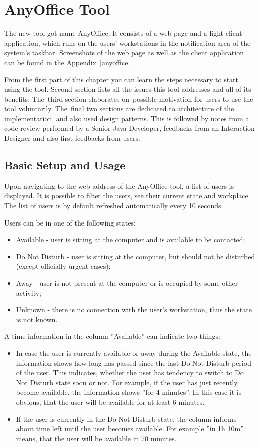 \documentclass[11pt,singleside]{myfithesis2}
\begin{document}
\chapter{AnyOffice Tool}

The new tool got name AnyOffice. It consists of a web page and a light client application, which runs on the users' workstations in the notification area of the system's taskbar. Screenshots of the web page as well as the client application can be found in the Appendix~\ref{anyoffice}.

From the first part of this chapter you can learn the steps necessary to start using the tool. Second section lists all the issues this tool addresses and all of its benefits. The~third section elaborates on~possible motivation for users to use the tool voluntarily. The~final two sections are dedicated to architecture of the implementation, and also used design patterns. This is followed by notes from a code review performed by a Senior Java Developer, feedbacks from an Interaction Designer and also first feedbacks from users.


	\section{Basic Setup and Usage}
Upon navigating to the web address of the AnyOffice tool, a list of users is displayed. It is possible to filter the users, see their current state and workplace. The list of users is by default refreshed automatically every 10 seconds.

Users can be in one of the following states:
\begin{itemize}
	\item Available - user is sitting at the computer and is available to be contacted;
	\item Do Not Disturb - user is sitting at the computer, but should not be disturbed (except officially urgent cases);
	\item Away - user is not present at the computer or is occupied by some other activity;
	\item Unknown - there is no connection with the user's workstation, thus the state is not known.
\end{itemize}

A time information in the column ''Available'' can indicate two things:
\begin{itemize}
	\item In case the user is currently available or away during the Available state, the information shows how long has passed since the last Do Not Disturb period of the user. This indicates, whether the user has tendency to switch to Do Not Disturb state soon or not. For example, if the user has just recently become available, the information shows ''for 4 minutes''. In this case it is obvious, that the user will be available for at least 6 minutes.
	\item If the user is currently in the Do Not Disturb state, the column informs about time left until the user becomes available. For example ''in 1h 10m'' means, that the user will be available in 70 minutes.
\end{itemize}
\end{document}
